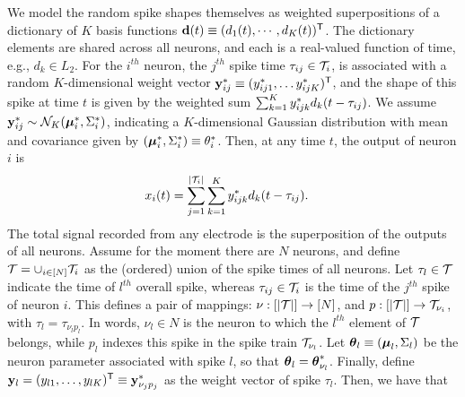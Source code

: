 We model the random spike shapes themselves as weighted superpositions of a dictionary of $K$ basis functions $\mathbf{d}(t) \equiv (d_1(t), \cdots, d_K(t))^{\mathsf{T}}$. The
dictionary elements are shared across all neurons, and each is a real-valued function of time, e.g., $d_k \in L_2$.
For the $i^{th}$ neuron, the $j^{th}$ spike time $\tau_{ij} \in \mathcal{T}_i$, is associated with a random $K$-dimensional weight vector $\mathbf{y}^*_{ij} \equiv (y^*_{ij1}, \ldots y^*_{ijK})^{\mathsf{T}}$, and the 
shape of this spike at time $t$ is given by the weighted sum $\sum_{k=1}^K y^*_{ijk} d_k(t-\tau_{ij})$. We assume $\mathbf{y}^*_{ij} \sim \mathcal{N}_K(\boldsymbol{\mu}^*_i, \Sigma^*_i)$, indicating a $K$-dimensional 
Gaussian distribution with mean and covariance given by $(\boldsymbol{\mu}^*_i, \Sigma^*_i) \equiv \theta^*_i$.   Then, at any time $t$, the output of neuron $i$ is
\begin{align}
  x_{i}(t) &= \sum_{j=1}^{|\mathcal{T}_i|} \sum_{k=1}^K y^*_{ijk} d_k(t - \tau_{ij}).
\end{align}
% 
% 
% 
% 
{The total signal recorded from any electrode  is the superposition of the outputs of all neurons. Assume for the moment there are $N$
neurons, and define $\mathcal{T} = \cup_{i \in [N]} \mathcal{T}_i$ as
the (ordered) union of the spike times of all neurons. 
Let $\tau_l \in \mathcal{T}$ indicate the time of $l^{th}$ overall spike, whereas $\tau_{ij} \in \mathcal{T}_i$ is the time of the $j^{th}$ spike of neuron $i$.
This defines a pair of mappings: $\nu:[|\mathcal{T}|]\rightarrow [N]$, and $p:[|\mathcal{T}|]\rightarrow \mathcal{T}_{\nu_i}$, with %
$\tau_l = \tau_{\nu_l p_l}$. 
In words, $\nu_l \in N$ is the neuron to which the $l^{th}$ element of $\mathcal{T}$ belongs, 
while $p_l$ indexes this spike in the spike train $\mathcal{T}_{\nu_l}$.
Let $\boldsymbol{\theta}_l \equiv (\boldsymbol{\mu}_l, \Sigma_l)$ be the neuron parameter associated with spike $l$, so that $\boldsymbol{\theta}_l = \boldsymbol{\theta}^*_{\nu_l}$. 
Finally, define $\mathbf{y}_l=(y_{l1}, \ldots, y_{lK})^{\mathsf{T}} \equiv \mathbf{y}^*_{\nu_j p_j}$ as the weight vector of spike $\tau_l$. Then, we have that}
